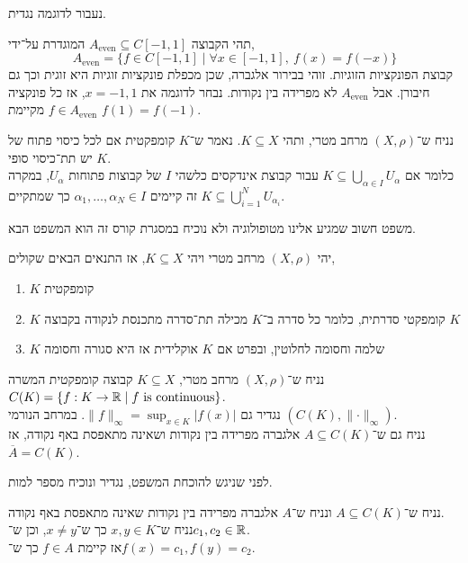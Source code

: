 נעבור לדוגמה נגדית.
\begin{example}
	תהי הקבוצה $A_{\text{even}} \subseteq C[-1, 1]$ המוגדרת על־ידי,
	\[
		A_{\text{even}}
		= \{ f \in C[-1, 1] \mid \forall x \in [-1, 1],\ f(x) = f(-x) \}
	\]
	קבוצת הפונקציות הזוגיות.
	זוהי בבירור אלגברה, שכן מכפלת פונקציות זוגיות היא זוגית וכך גם חיבורן.
	אבל $A_{\text{even}}$ לא מפרידה בין נקודות.
	נבחר לדוגמה את $x = -1, 1$, אז כל פונקציה $f \in A_{\text{even}}$ מקיימת $f(1) = f(-1)$.
\end{example}
\begin{definition}
	נניח ש־$(X, \rho)$ מרחב מטרי, ותהי $K \subseteq X$.
	נאמר ש־$K$ קומפקטית אם לכל כיסוי פתוח של $K$ יש תת־כיסוי סופי. \\
	כלומר אם $K \subseteq \bigcup_{\alpha \in I} U_{\alpha}$ עבור קבוצת אינדקסים כלשהי $I$ של קבוצות פתוחות $U_{\alpha}$,
	במקרה זה קיימים $\alpha_1, \ldots, \alpha_N \in I$ כך שמתקיים $K \subseteq \bigcup_{i = 1}^N U_{\alpha_i}$.
\end{definition}
משפט חשוב שמגיע אלינו מטופולוגיה ולא נוכיח במסגרת קורס זה הוא המשפט הבא.
\begin{theorem}
	יהי $(X, \rho)$ מרחב מטרי ויהי $K \subseteq X$, אז התנאים הבאים שקולים,
	\begin{enumerate}
		\item $K$ קומפקטית
		\item $K$ קומפקטי סדרתית,
			כלומר כל סדרה ב־$K$ מכילה תת־סדרה מתכנסת לנקודה בקבוצה $K$
		\item $K$ שלמה וחסומה לחלוטין, ובפרט אם $K$ אוקלידית אז היא סגורה וחסומה
	\end{enumerate}
\end{theorem}
\begin{theorem}\label{stone_weistrass_theorem}
	נניח ש־$(X, \rho)$ מרחב מטרי,
	$K \subseteq X$ קבוצה קומפקטית המשרה $C(K) = \{ f : K \to \mathbb{R} \mid f \text{ is continuous} \}$. \\
	נגדיר גם $\lVert f \rVert_\infty = \sup_{x \in K} |f(x)|$.
	במרחב הנורמי $(C(K), \lVert \cdot \rVert_\infty)$. \\
	נניח גם ש־$A \subseteq C(K)$ אלגברה מפרידה בין נקודות ושאינה מתאפסת באף נקודה,
	אז $\overline{A} = C(K)$.
\end{theorem}
לפני שניגש להוכחת המשפט, נגדיר ונוכיח מספר למות.
\begin{lemma}
	נניח ש־$A \subseteq C(K)$ ונניח ש־$A$ אלגברה מפרידה בין נקודות שאינה מתאפסת באף נקודה. \\
	נניח ש־$x, y \in K$ כך ש־$x \ne y$, וכן ש־$c_1, c_2 \in \mathbb{R}$. \\
	אז קיימת $f \in A$ כך ש־$f(x) = c_1, f(y) = c_2$.
\end{lemma}
